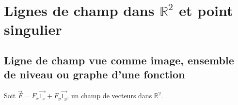 	
\section{Lignes de champ dans $\mathbb{R}^2$ et point singulier}
	\subsection{Ligne de champ vue comme image, ensemble de niveau ou 
	graphe d'une fonction}
	Soit $\vec{F} = F_x\vec{1_x}+F_y\vec{1_y}$, un champ de vecteurs dans 
	$\mathbb{R}^2$.\\
	
	\
	
